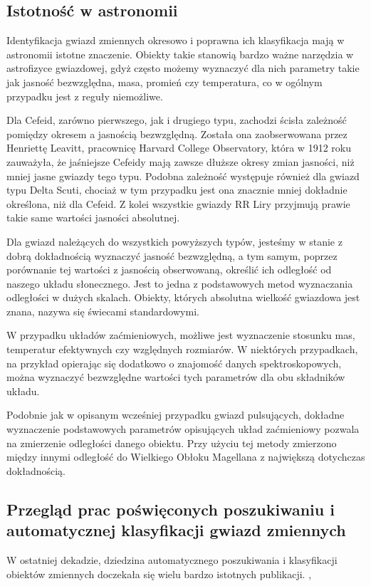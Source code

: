 \documentclass{pracalicmgr}
\begin{document}
    \subsection{Istotność w astronomii}
    Identyfikacja gwiazd zmiennych okresowo i poprawna ich klasyfikacja mają w astronomii istotne znaczenie. Obiekty takie stanowią bardzo ważne narzędzia w astrofizyce gwiazdowej, gdyż często możemy wyznaczyć dla nich parametry takie jak jasność bezwzględna, masa, promień czy temperatura, co w ogólnym przypadku jest z reguły niemożliwe.

    Dla Cefeid, zarówno pierwszego, jak i drugiego typu, zachodzi ścisła zależność pomiędzy okresem a jasnością bezwzględną. Została ona zaobserwowana przez Henriettę Leavitt, pracownicę Harvard College Observatory, która w 1912 roku zauważyła, że jaśniejsze Cefeidy mają zawsze dłuższe okresy zmian jasności, niż mniej jasne gwiazdy tego typu. Podobna zależność występuje również dla gwiazd typu Delta Scuti, chociaż w tym przypadku jest ona znacznie mniej dokładnie określona, niż dla Cefeid. Z kolei wszystkie gwiazdy RR Liry przyjmują prawie takie same wartości jasności absolutnej. 
    
    Dla gwiazd należących do wszystkich powyższych typów, jesteśmy w stanie z dobrą dokładnością wyznaczyć jasność bezwzględną, a tym samym, poprzez porównanie tej wartości z jasnością obserwowaną, określić ich odległość od naszego układu słonecznego. Jest to jedna z podstawowych metod wyznaczania odległości w dużych skalach. Obiekty, których absolutna wielkość gwiazdowa jest znana, nazywa się świecami standardowymi.
    
    W przypadku układów zaćmieniowych, możliwe jest wyznaczenie stosunku mas, temperatur efektywnych czy względnych rozmiarów. W niektórych przypadkach, na przykład opierając się dodatkowo o znajomość danych spektroskopowych, można wyznaczyć bezwzględne wartości tych parametrów dla obu składników układu.
    
    Podobnie jak w opisanym wcześniej przypadku gwiazd pulsujących, dokładne wyznaczenie podstawowych parametrów opisujących układ zaćmieniowy pozwala na zmierzenie odległości danego obiektu. Przy użyciu tej metody zmierzono między innymi odległość do Wielkiego Obłoku Magellana z największą dotychczas dokładnością.      
    \subsection[Przegląd prac poświęconych automatycznej klasyfikacji]{Przegląd prac poświęconych poszukiwaniu i automatycznej klasyfikacji gwiazd zmiennych}
    W ostatniej dekadzie, dziedzina automatycznego poszukiwania i klasyfikacji obiektów zmiennych doczekała się wielu bardzo istotnych publikacji. \citep{huijse:pipeline}, \citep{huijse:ckp}    
\end{document}
